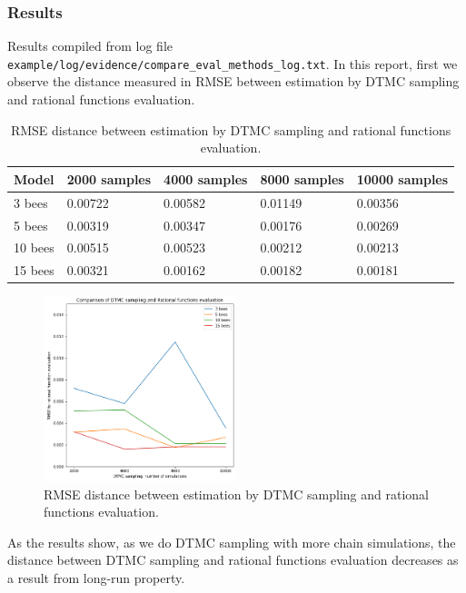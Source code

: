 \documentclass[12pt]{article}
\theoremstyle{definition}
\begin{document}
\subsubsection{Results}
Results compiled from log file
\texttt{example/log/evidence/compare\_eval\_methods\_log.txt}. In this report,
first we observe the distance measured in RMSE between estimation by DTMC
sampling and rational functions evaluation.

\begin{table}[H]
  \begin{tabular}{|l|l|l|l|l|}
    \hline
    Model   & 2000 samples          & 4000 samples          & 8000 samples          & 10000 samples         \\ \hline
    3 bees  & 0.00722 & 0.00582 & 0.01149 & 0.00356 \\ \hline
    5 bees  & 0.00319 & 0.00347 & 0.00176 & 0.00269 \\ \hline
    10 bees & 0.00515 & 0.00523 & 0.00212 & 0.00213 \\ \hline
    15 bees & 0.00321 & 0.00162 & 0.00182 & 0.00181 \\ \hline
  \end{tabular}
  \caption{RMSE distance between estimation by DTMC sampling and rational functions evaluation.}
\end{table}

\begin{figure}[H]
  \centering
  \includegraphics[width=0.5\textwidth,keepaspectratio]{figures/ex2_1.png}
  \caption{RMSE distance between estimation by DTMC sampling and rational functions evaluation.}
\end{figure}

As the results show, as we do DTMC sampling with more chain simulations, the
distance between DTMC sampling and rational functions evaluation decreases as a
result from long-run property.
\end{document}
